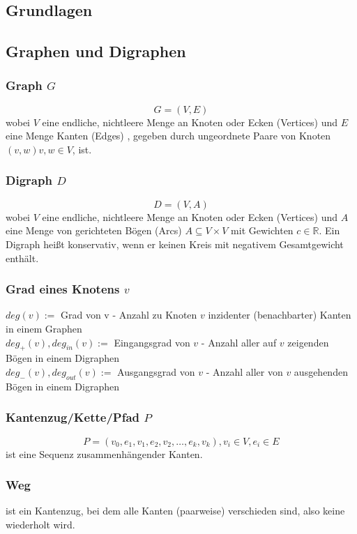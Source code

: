 \documentclass[10pt,a4paper,landscape]{article}
\begin{document}
\begin{multicols*}{2}
\normalsize
\section{ Grundlagen }
    \subsection{ Graphen und Digraphen }
    
    \subsubsection*{ Graph $G$ }
    \[ G = (V,E) \]
    wobei $V$ eine endliche, nichtleere Menge an Knoten oder Ecken (Vertices) und $E$ eine Menge Kanten (Edges) 
    , gegeben durch ungeordnete Paare von Knoten $(v,w) v, w \in V$, ist.
    
    \subsubsection*{ Digraph $D$ }
    \[ D = (V,A)\]
    wobei $V$ eine endliche, nichtleere Menge an Knoten oder Ecken (Vertices) und $A$ eine Menge von gerichteten 
    Bögen (Arcs) $A \subseteq V \times V$ mit Gewichten $c \in \mathbb{R}$. Ein Digraph heißt konservativ, wenn er 
    keinen Kreis mit negativem Gesamtgewicht enthält.

    \subsubsection*{ Grad eines Knotens $v$ }
    $deg(v) :=$ Grad von v - Anzahl zu Knoten $v$ inzidenter (benachbarter) Kanten in einem Graphen \\
    $deg_{+}(v), deg_{in}(v) :=$ Eingangsgrad von $v$ - Anzahl aller auf $v$ zeigenden Bögen in einem Digraphen \\
    $deg_{-}(v), deg_{out}(v) :=$ Ausgangsgrad von $v$ - Anzahl aller von $v$ ausgehenden Bögen in einem Digraphen 

    \subsubsection*{ Kantenzug/Kette/Pfad $P$ }
    \[ P = (v_0, e_1, v_1, e_2, v_2, \dots, e_k, v_k), v_i \in V, e_i \in E \]
    ist eine Sequenz zusammenhängender Kanten. 
    \subsubsection*{ Weg } ist ein Kantenzug, bei dem alle Kanten (paarweise) verschieden sind, also keine wiederholt wird.

\end{multicols*}
\end{document}
